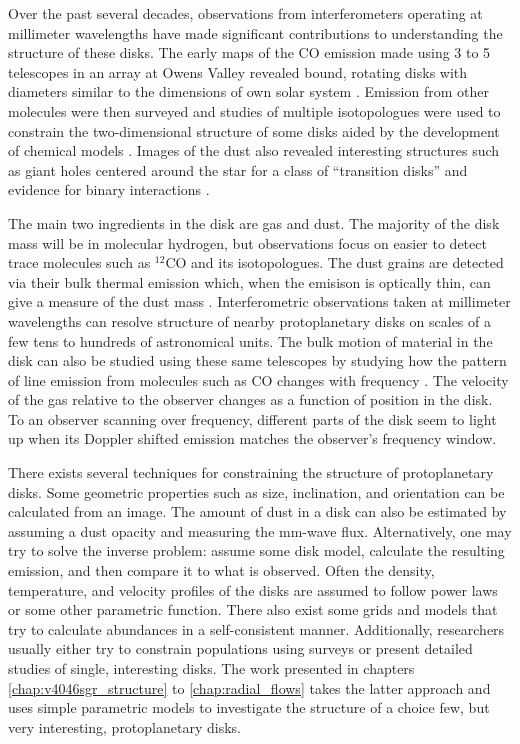 Over the past several decades, observations from interferometers operating at millimeter wavelengths have made
significant contributions to understanding the structure of these disks.  The early maps of the CO emission
made using 3 to 5 telescopes in an array at Owens Valley revealed bound, rotating disks with diameters 
similar to the dimensions of own solar system \citep{sargent87,weintraub89,koerner93}.  Emission from other 
molecules were then surveyed \citep{dutrey97} and studies of multiple isotopologues were used to constrain the 
two-dimensional structure of some disks \citep{dartois03,pietu07,qi11} aided by the development of 
chemical models \citep{aikawa99,aikawa01}.  Images of the dust also revealed interesting structures such as
giant holes centered around the star for a class of ``transition disks'' \citep{hughes07,brown09,andrews11} and 
evidence for binary interactions \citep{akeson98}.


The main two ingredients in the disk are gas and dust.  The majority of the disk mass will be in molecular 
hydrogen, but observations focus on easier to detect trace molecules such as $^{12}$CO and its isotopologues.
The dust grains are detected via their bulk thermal emission which, when the emisison is optically thin,  
can give a measure of the dust mass \citep{hildebrand83}.  Interferometric observations taken at 
millimeter wavelengths can resolve structure of nearby protoplanetary disks on scales of a few tens to 
hundreds of astronomical units.   The bulk motion of material in the disk can also be 
studied using these same telescopes by studying how the pattern of line emission
from molecules such as CO changes with frequency \citep{beckwith93}.  The velocity of the gas relative to the 
observer 
changes as a function of position in the disk. To an observer scanning over frequency, different parts of the 
disk seem to light up when its Doppler shifted emission matches the observer's frequency window.

There exists several techniques for constraining the structure of protoplanetary disks.  Some geometric 
properties such as size, inclination, and orientation can be calculated from an image.  The amount of dust 
in a disk can also be estimated by assuming a dust opacity and measuring the mm-wave flux.  Alternatively, one 
may try to solve the inverse problem: assume some disk model, calculate the resulting emission, and then compare
it to what is observed.  Often the density, temperature, and velocity profiles of the disks are assumed to 
follow power laws or some other parametric function.  There also exist some grids and models that try to 
calculate abundances in a self-consistent manner.  Additionally, researchers usually either try to constrain 
populations using 
surveys \citep[i.e.][]{andrews11,oberg11,harris12} or present detailed studies of single, 
interesting disks.  The work
presented in chapters \ref{chap:v4046sgr_structure} to \ref{chap:radial_flows} takes the latter approach and uses simple parametric 
models to investigate the structure of a choice few, but very interesting, protoplanetary disks.

